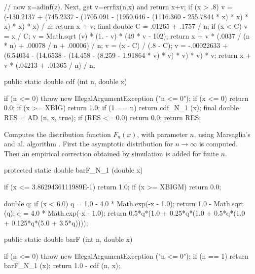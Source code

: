 \begin{code}
\begin{hide}
{      // now x=adinf(z). Next, get v=errfix(n,x) and return x+v;
      if (x > .8) {
         v = (-130.2137 + (745.2337 - (1705.091 - (1950.646 - (1116.360 -
                        255.7844 * x) * x) * x) * x) * x) / n;
         return x + v;
      }
      final double C = .01265 + .1757 / n;
      if (x < C) {
         v = x / C;
         v = Math.sqrt (v) * (1. - v) * (49 * v - 102);
         return x + v * (.0037 / (n * n) + .00078 / n + .00006) / n;
      }
      v = (x - C) / (.8 - C);
      v = -.00022633 + (6.54034 - (14.6538 - (14.458 - (8.259 -
               1.91864 * v) * v) * v) * v) * v;
      return x + v * (.04213 + .01365 / n) / n;
   }
\end{hide}

   public static double cdf (int n, double x)\begin{hide} {
      if (n <= 0)
         throw new IllegalArgumentException ("n <= 0");
      if (x <= 0)
         return 0.0;
      if (x >= XBIG)
         return 1.0;
      if (1 == n)
         return cdf_N_1 (x);
      final double RES = AD (n, x, true);
      if (RES <= 0.0)
         return 0.0;
      return RES;
   }\end{hide}
\end{code}
\begin{tabb}
  Computes the \ad{} distribution function $F_n(x)$, with parameter $n$,
  using Marsaglia's and al. algorithm \cite{tMAR04a}. First the asymptotic
  distribution for $n\to\infty$ is computed.
  Then an empirical correction obtained by simulation is added for finite $n$.
 \end{tabb}
\begin{code} \begin{hide}

   protected static double barF_N_1 (double x)
   {
      if (x <= 3.8629436111989E-1)
         return 1.0;
      if (x >= XBIGM)
         return 0.0;

      double q;
      if (x < 6.0) {
         q = 1.0 - 4.0 * Math.exp(-x - 1.0);
         return 1.0 - Math.sqrt (q);
      }
      q = 4.0 * Math.exp(-x - 1.0);
      return 0.5*q*(1.0 + 0.25*q*(1.0 + 0.5*q*(1.0 + 0.125*q*(5.0 + 3.5*q))));
   }\end{hide}

   public static double barF (int n, double x)\begin{hide} {
      if (n <= 0)
        throw new IllegalArgumentException ("n <= 0");
      if (n == 1)
         return barF_N_1 (x);
      return 1.0 - cdf (n, x);
   }\end{hide}
\end{code}
